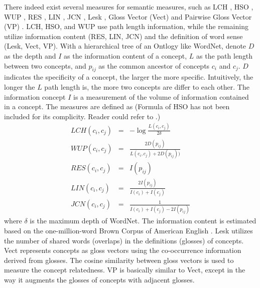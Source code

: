 There indeed exist several measures for semantic measures, such as
LCH \cite{C.Leacock:1998}, HSO \cite{G.Hirst:1997}, WUP
\cite{W.Zhibiao:AMACL:1994}, RES \cite{Philip.Resnik:IJCAI:1995},
LIN \cite{Dekang.Lin:AMACL:1997}, JCN \cite{JayJ.Jiang:ICRCL:1997},
Lesk \cite{M.Lesk:AICSD:1986}, Gloss Vector (Vect)
\cite{Siddharth.Patwardhan:ACLWMSSBCLPT:2006} and Pairwise Gloss
Vector (VP) \cite{Siddharth.Patwardhan:ACLWMSSBCLPT:2006}. LCH, HSO,
and WUP use path length information, while the remaining utilize
information content (RES, LIN, JCN) and the definition of word sense
(Lesk, Vect, VP). With a hierarchical tree of an Ontlogy like
WordNet, denote $D$ as the depth and $I$ as the information content
of a concept, $L$ as the path length between two concepts, and
$p_{ij}$ as the common ancestor of concepts $c_i$ and $c_j$. $D$
indicates the specificity of a concept, the larger the more
specific. Intuitively, the longer the $L$ path length is, the more
two concepts are differ to each other. The information concept $I$
is a measurement of the volume of information contained in a
concept. The measures are defined as (Formula of HSO has not been
included for its complicity. Reader could refer to
\cite{G.Hirst:1997}.)
\begin{eqnarray}
LCH(c_i,c_j) & = & -\log \frac{L(c_i,c_j)}{2\delta}\\
WUP(c_i, c_j) & = & \frac{2 D(p_{ij})}{L(c_i,c_j)+2D(p_{ij}))}\label{eqn:wup} \\
RES(c_i,c_j) & = & I(p_{ij})\\
 LIN(c_i,c_j) & = & \frac{2 I(p_{ij})}{I(c_i)+I(c_j)} \\
 JCN(c_i,c_j) & = & \frac{1}{I(c_i)+I(c_j)-2I(p_{ij})}
\end{eqnarray}
where $\delta$ is the maximum depth of WordNet. The information
content is estimated based on the one-million-word Brown Corpus of
American English \cite{N.Francis:1982}. Lesk utilizes the number of
shared words (overlaps) in the definitions (glosses) of concepts.
Vect represents concepts as gloss vectors using the co-occurrence
information derived from glosses. The cosine similarity between
gloss vectors is used to measure the concept relatedness. VP is
basically similar to Vect, except in the way it augments the glosses
of concepts with adjacent glosses.

